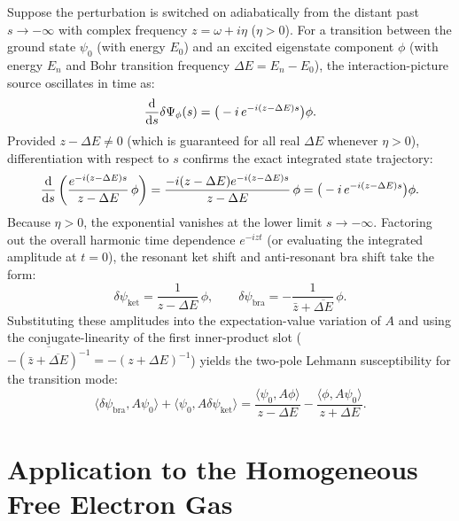 \documentclass[11pt, a4paper]{article}
\numberwithin{equation}{section}
\begin{document}
Suppose the perturbation is switched on adiabatically from the distant past $s \to -\infty$ with complex frequency $z = \omega + i\eta$ ($\eta > 0$). For a transition between the ground state $\psi_0$ (with energy $E_0$) and an excited eigenstate component $\phi$ (with energy $E_n$ and Bohr transition frequency $\Delta E = E_n - E_0$), the interaction-picture source oscillates in time as:
\begin{equation}
  \dv{s} \delta\Psi_\phi(s) = \big( -i \, e^{-i (z - \Delta E) s} \big) \phi.
\end{equation}
Provided $z - \Delta E \neq 0$ (which is guaranteed for all real $\Delta E$ whenever $\eta > 0$), differentiation with respect to $s$ confirms the exact integrated state trajectory:
\begin{equation}\label{eq:lindhard_mode}
  \dv{s} \left( \frac{e^{-i (z - \Delta E) s}}{z - \Delta E} \, \phi \right)
  = \frac{-i(z - \Delta E) e^{-i (z - \Delta E) s}}{z - \Delta E} \, \phi
  = \big( -i \, e^{-i (z - \Delta E) s} \big) \phi.
\end{equation}
Because $\eta > 0$, the exponential vanishes at the lower limit $s \to -\infty$. Factoring out the overall harmonic time dependence $e^{-i z t}$ (or evaluating the integrated amplitude at $t = 0$), the resonant ket shift and anti-resonant bra shift take the form:
\begin{equation}
  \delta\psi_{\mathrm{ket}} = \frac{1}{z - \Delta E} \, \phi, \qquad
  \delta\psi_{\mathrm{bra}} = -\frac{1}{\bar{z} + \overline{\Delta E}} \, \phi.
\end{equation}
Substituting these amplitudes into the expectation-value variation of $A$ and using the conjugate-linearity of the first inner-product slot ($\overline{-(\bar{z} + \overline{\Delta E})^{-1}} = -(z + \Delta E)^{-1}$) yields the two-pole Lehmann susceptibility for the transition mode:
\begin{equation}\label{eq:two_pole_lehmann}
  \langle \delta\psi_{\mathrm{bra}}, A \psi_0 \rangle + \langle \psi_0, A \delta\psi_{\mathrm{ket}} \rangle
  = \frac{\langle \psi_0, A \phi \rangle}{z - \Delta E} - \frac{\langle \phi, A \psi_0 \rangle}{z + \Delta E}.
\end{equation}

\section{Application to the Homogeneous Free Electron Gas}
\end{document}
